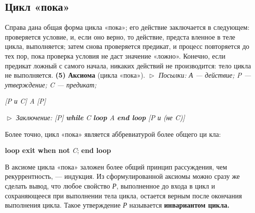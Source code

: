 \subsection{Цикл «пока»}
\noindent Справа  дана  общая  форма  цикла  «пока»;  его 
действие заключается в следующем: проверяется 
условие, и, если оно верно, то действие, предста­
вленное в теле цикла, выполняется; затем снова 
проверяется предикат, и процесс повторяется до
тех пор, пока проверка условия не даст значение «ложно». Конечно, если 
предикат ложный с самого начала, никаких действий не производится: 
тело цикла не выполняется.
\newline
\textbf{(5) Аксиома} (цикла «пока»).
\newline
$\vartriangleright$ \textit{Посылки: А --- действие; P --- утверждение; C --- предикат;}
\begin{center}
\textit{[P и C] A [P]}
\end{center}
$\vartriangleright$ \textit{Заключение:  \textit{[P]} \textbf{while} \textit{C} \textbf{loop} \textit{A} \textbf{end loop} \textit{[P и (не C)]}}

\parindent=1cm Более точно, цикл «пока» является аббревиатурой более общего ци­
кла:
\begin{center}
\textbf{loop exit when not} \textit{C};  \textbf{end loop} 
\end{center}
В аксиоме цикла «пока» заложен более общий принцип рассуждения, чем 
рекуррентность,  — индукция.  Из  сформулированной аксиомы можно 
сразу же сделать вывод, что любое свойство \textit{Р}, выполненное до входа 
в цикл и сохраняющееся при выполнении тела цикла, остается верным 
после окончания выполнения цикла. Такое утверждение \textit{Р} называется 
\textbf{инвариантом цикла.}

